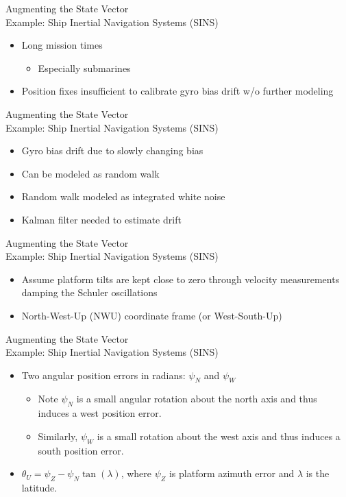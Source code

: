 \begin{frame}
Augmenting the State Vector\\
Example: Ship Inertial Navigation Systems (SINS)
\begin{itemize}
  \item Long mission times
\begin{itemize}
	\item Especially submarines
\end{itemize}
  \item Position fixes insufficient to calibrate gyro bias drift w/o further modeling
\end{itemize} 
\end{frame}
\begin{frame}
Augmenting the State Vector\\
Example: Ship Inertial Navigation Systems (SINS)
\begin{itemize}
  \item Gyro bias drift due to slowly changing bias
  \item Can be modeled as random walk
  \item Random walk modeled as integrated white noise
  \item Kalman filter needed to estimate drift 
\end{itemize} 
\end{frame}
\begin{frame}
Augmenting the State Vector\\
Example: Ship Inertial Navigation Systems (SINS)
\begin{itemize}
  \item Assume platform tilts are kept close to zero through velocity measurements damping the Schuler oscillations
  \item North-West-Up (NWU) coordinate frame (or West-South-Up)
\end{itemize} 
\end{frame}
\begin{frame}
Augmenting the State Vector\\
Example: Ship Inertial Navigation Systems (SINS)
\begin{itemize}
  \item Two angular position errors in radians:  $\psi_N$ and $\psi_W$
\begin{itemize}
	\item Note $\psi_N$ is a small angular rotation about the north axis and  thus induces a west position error.
    \item Similarly, $\psi_W$ is a small rotation about the west axis and thus induces a south position error.
\end{itemize}
  \item $\theta_U =\psi_Z - \psi_N \tan(\lambda)$, where $\psi_Z$ is platform azimuth error and $\lambda$ is the latitude.
\end{itemize} 
\end{frame}
